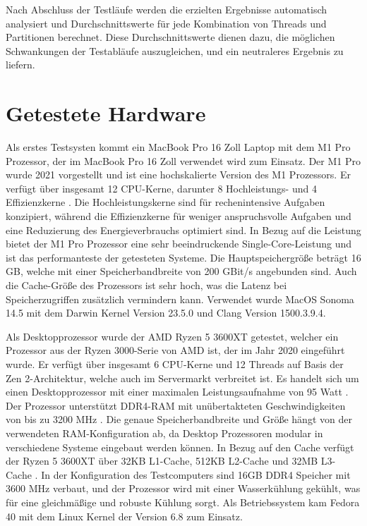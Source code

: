 Nach Abschluss der Testläufe werden die erzielten Ergebnisse automatisch analysiert und Durchschnittswerte für jede Kombination von Threads und Partitionen berechnet. Diese Durchschnittswerte dienen dazu, die möglichen Schwankungen der Testabläufe auszugleichen, und ein neutraleres Ergebnis zu liefern.

\section{Getestete Hardware}

Als erstes Testsysten kommt ein MacBook Pro 16 Zoll Laptop mit dem M1 Pro Prozessor, der im MacBook Pro 16 Zoll verwendet wird zum Einsatz. Der M1 Pro wurde 2021 vorgestellt und ist eine hochskalierte Version des M1 Prozessors. Er verfügt über insgesamt 12 CPU-Kerne, darunter 8 Hochleistungs- und 4 Effizienzkerne \citep{MacBook_Technische_Daten}. Die Hochleistungskerne sind für rechenintensive Aufgaben konzipiert, während die Effizienzkerne für weniger anspruchsvolle Aufgaben und eine Reduzierung des Energieverbrauchs optimiert sind.
In Bezug auf die Leistung bietet der M1 Pro Prozessor eine sehr beeindruckende Single-Core-Leistung und ist das performanteste der getesteten Systeme. Die Hauptspeichergröße beträgt 16 GB, welche mit einer Speicherbandbreite von 200 GBit/s \citep{MacBook_Technische_Daten} angebunden sind. Auch die Cache-Größe des Prozessors ist sehr hoch, was die Latenz bei Speicherzugriffen zusätzlich vermindern kann.
Verwendet wurde MacOS Sonoma 14.5 mit dem Darwin Kernel Version 23.5.0 und Clang Version 1500.3.9.4.

Als Desktopprozessor wurde der AMD Ryzen 5 3600XT getestet, welcher ein Prozessor aus der Ryzen 3000-Serie von AMD ist, der im Jahr 2020 eingeführt wurde. Er verfügt über insgesamt 6 CPU-Kerne und 12 Threads auf Basis der Zen 2-Architektur, welche auch im Servermarkt verbreitet ist. Es handelt sich um einen Desktopprozessor mit einer maximalen Leistungsaufnahme von 95 Watt \citep{Ryzen_Technische_Daten}.
Der Prozessor unterstützt DDR4-RAM mit unübertakteten Geschwindigkeiten von bis zu 3200 MHz \citep{Ryzen_Technische_Daten}. Die genaue Speicherbandbreite und Größe hängt von der verwendeten RAM-Konfiguration ab, da Desktop Prozessoren modular in verschiedene Systeme eingebaut werden können.
In Bezug auf den Cache verfügt der Ryzen 5 3600XT über 32KB L1-Cache, 512KB L2-Cache und 32MB L3-Cache \citep{Ryzen_Technische_Daten}. In der Konfiguration des Testcomputers sind 16GB DDR4 Speicher mit 3600 MHz verbaut, und der Prozessor wird mit einer Wasserkühlung gekühlt, was für eine gleichmäßige und robuste Kühlung sorgt. Als Betriebssystem kam Fedora 40 mit dem Linux Kernel der Version 6.8 zum Einsatz.

